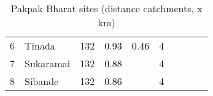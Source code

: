 \begin{table}[ht]
\begin{tabular}{C{0.05\textwidth}C{0.15\textwidth}C{0.08\textwidth}C{0.08\textwidth}C{0.08\textwidth}C{0.08\textwidth}C{0.08\textwidth}C{0.08\textwidth}C{0.08\textwidth}C{0.08\textwidth}}
  {6} & Tinada & 132 & \textcolor[HTML]{000000}{0.93} & \textcolor[HTML]{000000}{0.46} & \textcolor[HTML]{000000}{4} &  &  &  &  \\ 
  {7} & Sukaramai & 132 & \textcolor[HTML]{000000}{0.88} & \textcolor[HTML]{FFFFFF}{0.47} & \textcolor[HTML]{000000}{4} &  &  &  &  \\ 
  {8} & Sibande & 132 & \textcolor[HTML]{000000}{0.86} & \textcolor[HTML]{FFFFFF}{0.50} & \textcolor[HTML]{000000}{4} &  &  &  &  \\ 
  \end{tabular}
\endgroup
\caption{Pakpak Bharat sites (distance catchments, x km)} 
\label{tab:pakpak_bharat_dist}
\end{table}
